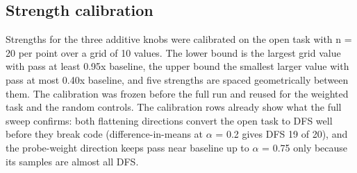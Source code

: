 \documentclass[11pt,letterpaper]{article}
\begin{document}
\subsection{Strength calibration}
Strengths for the three additive knobs were calibrated on the open task with n = 20 per point over a grid of 10 values. The lower bound is the largest grid value with pass at least 0.95x baseline, the upper bound the smallest larger value with pass at most 0.40x baseline, and five strengths are spaced geometrically between them. The calibration was frozen before the full run and reused for the weighted task and the random controls. The calibration rows already show what the full sweep confirms: both flattening directions convert the open task to DFS well before they break code (difference-in-means at \ensuremath{\alpha} = 0.2 gives DFS 19 of 20), and the probe-weight direction keeps pass near baseline up to \ensuremath{\alpha} = 0.75 only because its samples are almost all DFS.
\end{document}
